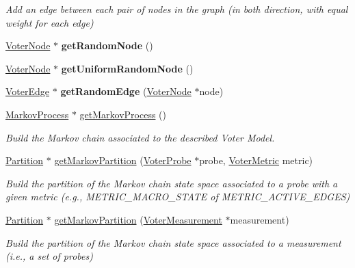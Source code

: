 \begin{DoxyCompactItemize}
\begin{DoxyCompactList}\small\item\em Add an edge between each pair of nodes in the graph (in both direction, with equal weight for each edge) \end{DoxyCompactList}\item 
\hypertarget{class_voter_graph_ac408a931308f3cfd441b0f6a3c9eb6be}{\hyperlink{class_voter_node}{Voter\-Node} $\ast$ {\bfseries get\-Random\-Node} ()}\label{class_voter_graph_ac408a931308f3cfd441b0f6a3c9eb6be}

\item 
\hypertarget{class_voter_graph_a2750643b2dc5bd91fda44a7d79c56c85}{\hyperlink{class_voter_node}{Voter\-Node} $\ast$ {\bfseries get\-Uniform\-Random\-Node} ()}\label{class_voter_graph_a2750643b2dc5bd91fda44a7d79c56c85}

\item 
\hypertarget{class_voter_graph_a3fcc3956fd3d18bb81e1a237527742e1}{\hyperlink{class_voter_edge}{Voter\-Edge} $\ast$ {\bfseries get\-Random\-Edge} (\hyperlink{class_voter_node}{Voter\-Node} $\ast$node)}\label{class_voter_graph_a3fcc3956fd3d18bb81e1a237527742e1}

\item 
\hyperlink{class_markov_process}{Markov\-Process} $\ast$ \hyperlink{class_voter_graph_acc86929339ec0a0ce2946146919b1eb7}{get\-Markov\-Process} ()
\begin{DoxyCompactList}\small\item\em Build the Markov chain associated to the described Voter Model. \end{DoxyCompactList}\item 
\hyperlink{class_partition}{Partition} $\ast$ \hyperlink{class_voter_graph_a04231db4297c6a1d4232c5403b202d71}{get\-Markov\-Partition} (\hyperlink{class_voter_probe}{Voter\-Probe} $\ast$probe, \hyperlink{voter__graph_8hpp_acb4c45a5ce4a55eee28e54e60409b9c5}{Voter\-Metric} metric)
\begin{DoxyCompactList}\small\item\em Build the partition of the Markov chain state space associated to a probe with a given metric (e.\-g., M\-E\-T\-R\-I\-C\-\_\-\-M\-A\-C\-R\-O\-\_\-\-S\-T\-A\-T\-E of M\-E\-T\-R\-I\-C\-\_\-\-A\-C\-T\-I\-V\-E\-\_\-\-E\-D\-G\-E\-S) \end{DoxyCompactList}\item 
\hyperlink{class_partition}{Partition} $\ast$ \hyperlink{class_voter_graph_a2c0a299c1249cc04e011d0f507467007}{get\-Markov\-Partition} (\hyperlink{class_voter_measurement}{Voter\-Measurement} $\ast$measurement)
\begin{DoxyCompactList}\small\item\em Build the partition of the Markov chain state space associated to a measurement (i.\-e., a set of probes) \end{DoxyCompactList}\end{DoxyCompactItemize}
